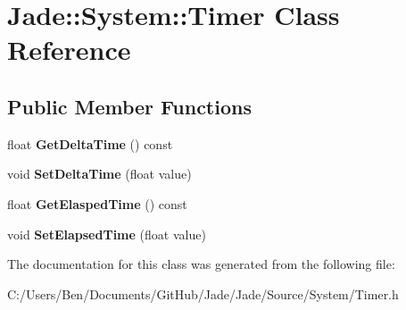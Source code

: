 \hypertarget{class_jade_1_1_system_1_1_timer}{}\section{Jade\+:\+:System\+:\+:Timer Class Reference}
\label{class_jade_1_1_system_1_1_timer}
\subsection*{Public Member Functions}
\begin{DoxyCompactItemize}
\item 
\hypertarget{class_jade_1_1_system_1_1_timer_a98d6cf8fcc1b9402f327c048159423c9}{}float {\bfseries Get\+Delta\+Time} () const \label{class_jade_1_1_system_1_1_timer_a98d6cf8fcc1b9402f327c048159423c9}

\item 
\hypertarget{class_jade_1_1_system_1_1_timer_a6ecf21b869b1890514dc6b68b119a6c7}{}void {\bfseries Set\+Delta\+Time} (float value)\label{class_jade_1_1_system_1_1_timer_a6ecf21b869b1890514dc6b68b119a6c7}

\item 
\hypertarget{class_jade_1_1_system_1_1_timer_a8ded659a510f3bb3f5e1b7132bb7eeb2}{}float {\bfseries Get\+Elasped\+Time} () const \label{class_jade_1_1_system_1_1_timer_a8ded659a510f3bb3f5e1b7132bb7eeb2}

\item 
\hypertarget{class_jade_1_1_system_1_1_timer_abd0304fb7ec5b84cb1c6e1eed127387b}{}void {\bfseries Set\+Elapsed\+Time} (float value)\label{class_jade_1_1_system_1_1_timer_abd0304fb7ec5b84cb1c6e1eed127387b}

\end{DoxyCompactItemize}


The documentation for this class was generated from the following file\+:\begin{DoxyCompactItemize}
\item 
C\+:/\+Users/\+Ben/\+Documents/\+Git\+Hub/\+Jade/\+Jade/\+Source/\+System/Timer.\+h\end{DoxyCompactItemize}
